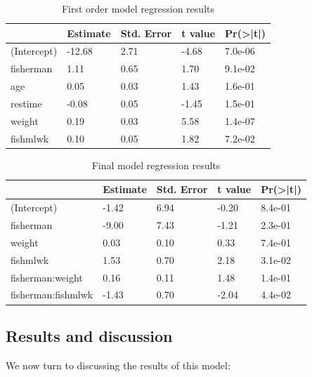 \documentclass[12pt,]{article}
\begin{document}
\begin{table}[t]

\caption{\label{tab:unnamed-chunk-12}\label{tbl:fullmodel}First order model regression results}
\centering
\begin{tabular}{l|l|l|l|l}
\hline
  & Estimate & Std. Error & t value & Pr(>|t|)\\
\hline
\rowcolor{gray!6}  (Intercept) & -12.68 & 2.71 & -4.68 & 7.0e-06\\
\hline
fisherman & 1.11 & 0.65 & 1.70 & 9.1e-02\\
\hline
\rowcolor{gray!6}  age & 0.05 & 0.03 & 1.43 & 1.6e-01\\
\hline
restime & -0.08 & 0.05 & -1.45 & 1.5e-01\\
\hline
\rowcolor{gray!6}  weight & 0.19 & 0.03 & 5.58 & 1.4e-07\\
\hline
fishmlwk & 0.10 & 0.05 & 1.82 & 7.2e-02\\
\hline
\end{tabular}
\end{table}

\begin{table}[t]

\caption{\label{tab:unnamed-chunk-14}\label{tbl:interactionmodel}Final model regression results}
\centering
\begin{tabular}{l|l|l|l|l}
\hline
  & Estimate & Std. Error & t value & Pr(>|t|)\\
\hline
\rowcolor{gray!6}  (Intercept) & -1.42 & 6.94 & -0.20 & 8.4e-01\\
\hline
fisherman & -9.00 & 7.43 & -1.21 & 2.3e-01\\
\hline
\rowcolor{gray!6}  weight & 0.03 & 0.10 & 0.33 & 7.4e-01\\
\hline
fishmlwk & 1.53 & 0.70 & 2.18 & 3.1e-02\\
\hline
\rowcolor{gray!6}  fisherman:weight & 0.16 & 0.11 & 1.48 & 1.4e-01\\
\hline
fisherman:fishmlwk & -1.43 & 0.70 & -2.04 & 4.4e-02\\
\hline
\end{tabular}
\end{table}

\subsection{Results and discussion}\label{results-and-discussion}

We now turn to discussing the results of this model:
\end{document}
